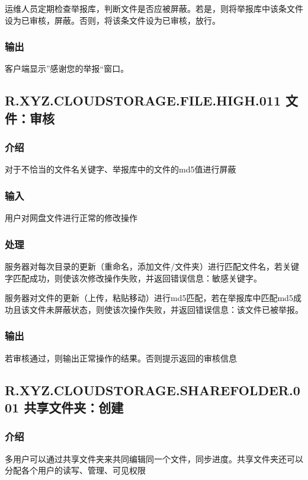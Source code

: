 运维人员定期检查举报库，判断文件是否应被屏蔽。若是，则将举报库中该条文件设为已审核，屏蔽。否则，将该条文件设为已审核，放行。

\subsubsection{输出} 
客户端显示”感谢您的举报“窗口。


\subsection{R.XYZ.CLOUDSTORAGE.FILE.HIGH.011 文件：审核}

\subsubsection{介绍}
对于不恰当的文件名关键字、举报库中的文件的md5值进行屏蔽

\subsubsection{输入} 
用户对网盘文件进行正常的修改操作

\subsubsection{处理} 
服务器对每次目录的更新（重命名，添加文件/文件夹）进行匹配文件名，若关键字匹配成功，则使该次修改操作失败，并返回错误信息：敏感关键字。

服务器对文件的更新（上传，粘贴移动）进行md5匹配，若在举报库中匹配md5成功且该文件未屏蔽状态，则使该次操作失败，并返回错误信息：该文件已被举报。

\subsubsection{输出} 
若审核通过，则输出正常操作的结果。否则提示返回的审核信息


\subsection{R.XYZ.CLOUDSTORAGE.SHAREFOLDER.001 共享文件夹：创建}

\subsubsection{介绍}

多用户可以通过共享文件夹来共同编辑同一个文件，同步进度。共享文件夹还可以分配各个用户的读写、管理、可见权限

